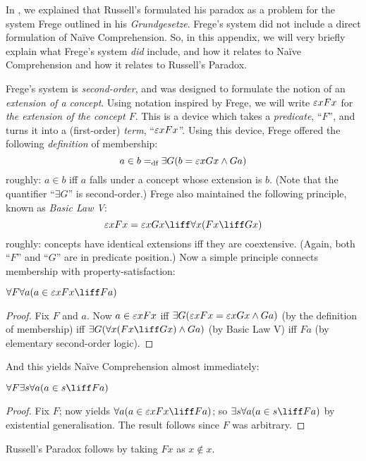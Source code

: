 \documentclass[../../../include/open-logic-section]{subfiles}
\begin{document}


In , we explained that Russell's formulated his
paradox as a problem for the system Frege outlined in his
\emph{Grundgesetze}. Frege's system did not include a direct
formulation of Na\"{i}ve Comprehension. So, in this appendix, we will
very briefly explain what Frege's system \emph{did} include, and how
it relates to Na\"ive Comprehension and how it relates to Russell's
Paradox.

Frege's system is \emph{second-order}, and was designed to formulate
the notion of an \emph{extension of a concept}. Using notation
inspired by Frege, we will write $\fregeext{F}$ for \emph{the extension
of the concept $F$}. This is a device which takes a \emph{predicate},
``$F$'', and turns it into a (first-order) \emph{term},
``$\fregeext{F}$''. Using this device, Frege offered the following
\emph{definition} of membership:
\[
	a \in b =_\text{df} \exists G(b = \fregeext{G} \land Ga)
\]
roughly: $a \in b$ iff $a$ falls under a concept whose extension is
$b$. (Note that the quantifier ``$\exists G$'' is second-order.) Frege
also maintained the following principle, known as \emph{Basic Law V}: 
$$\fregeext{F} = \fregeext{G} \liff \forall x (Fx \liff Gx)$$
roughly: concepts have identical extensions iff they are coextensive. (Again, both ``$F$'' and ``$G$'' are in predicate position.) Now a simple principle connects membership with property-satisfaction:

\begin{lem}
$\forall F \forall a(a \in \fregeext{F} \liff Fa)$
\end{lem}

\begin{proof} 
Fix $F$ and $a$. Now $a \in \fregeext{F}$ iff $\exists G(\fregeext{F}
= \fregeext{G} \land Ga)$ (by the definition of membership) iff
$\exists G(\forall x(Fx \liff Gx) \land Ga)$ (by Basic Law V) iff $Fa$
(by elementary second-order logic).
\end{proof}

And this yields Na\"ive Comprehension almost immediately:

\begin{lem}
$\forall F \exists s \forall a (a \in s \liff Fa)$
\end{lem}

\begin{proof}
Fix $F$; now  yields $\forall a (a \in
\fregeext{F} \liff Fa)$; so $\exists s\forall a(a \in s \liff Fa)$ by
existential generalisation. The result follows since $F$ was
arbitrary.
\end{proof}

Russell's Paradox follows by taking $Fx$ as $x \notin x$. 
\end{document}
